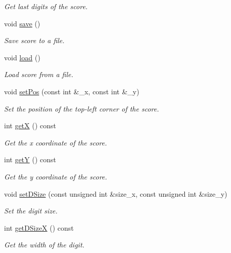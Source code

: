\begin{DoxyCompactItemize}
\begin{DoxyCompactList}\small\item\em Get last digits of the score. \end{DoxyCompactList}\item 
void \mbox{\hyperlink{class_score_a81a84a2163ddb4d23b3fc96b1dd54049}{save}} ()
\begin{DoxyCompactList}\small\item\em Save score to a file. \end{DoxyCompactList}\item 
void \mbox{\hyperlink{class_score_a81abff296ffdfa01fac193c6a3109080}{load}} ()
\begin{DoxyCompactList}\small\item\em Load score from a file. \end{DoxyCompactList}\item 
void \mbox{\hyperlink{class_score_aeb5434203cfadb9a9c679d9481ae939a}{set\+Pos}} (const int \&\+\_\+x, const int \&\+\_\+y)
\begin{DoxyCompactList}\small\item\em Set the position of the top-\/left corner of the score. \end{DoxyCompactList}\item 
int \mbox{\hyperlink{class_score_aaae02b51a637062330b3259952974ae8}{getX}} () const
\begin{DoxyCompactList}\small\item\em Get the x coordinate of the score. \end{DoxyCompactList}\item 
int \mbox{\hyperlink{class_score_a669f6def2fbf922750ce054a0fd0b915}{getY}} () const
\begin{DoxyCompactList}\small\item\em Get the y coordinate of the score. \end{DoxyCompactList}\item 
void \mbox{\hyperlink{class_score_a86b1e2a967847b148f79504ef7d4e866}{set\+D\+Size}} (const unsigned int \&size\+\_\+x, const unsigned int \&size\+\_\+y)
\begin{DoxyCompactList}\small\item\em Set the digit size. \end{DoxyCompactList}\item 
int \mbox{\hyperlink{class_score_a5c4891bd7ea2e4baefe364a5bc281861}{get\+D\+SizeX}} () const
\begin{DoxyCompactList}\small\item\em Get the width of the digit. \end{DoxyCompactList}\item 

\end{DoxyCompactItemize}
